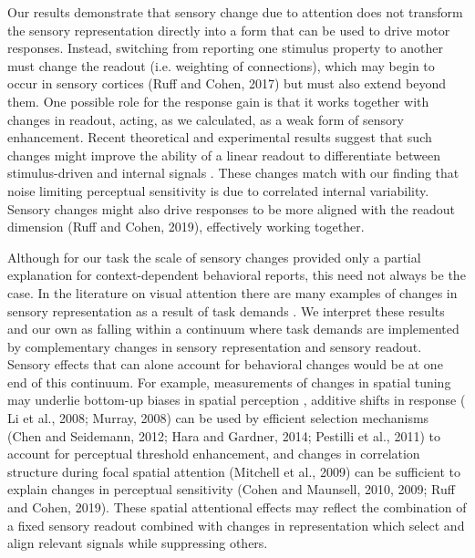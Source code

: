 \documentclass{report}
\begin{document}
Our results demonstrate that sensory change due to attention does not transform the sensory representation directly into a form that can be used to drive motor responses. Instead, switching from reporting one stimulus property to another must change the readout (i.e. weighting of connections), which may begin to occur in sensory cortices (Ruff and Cohen, 2017) but must also extend beyond them. One possible role for the response gain is that it works together with changes in readout, acting, as we calculated, as a weak form of sensory enhancement. Recent theoretical and experimental results suggest that such changes might improve the ability of a linear readout to differentiate between stimulus-driven and internal signals \citep{Ecker2016-ro,Rabinowitz2015-uz,Snyder2018-yr}. These changes match with our finding that noise limiting perceptual sensitivity is due to correlated internal variability. Sensory changes might also drive responses to be more aligned with the readout dimension (Ruff and Cohen, 2019), effectively working together.  

Although for our task the scale of sensory changes provided only a partial explanation for context-dependent behavioral reports, this need not always be the case. In the literature on visual attention there are many examples of changes in sensory representation as a result of task demands \citep{Carrasco2011-xp}. We interpret these results and our own as falling within a continuum where task demands are implemented by complementary changes in sensory representation and sensory readout. Sensory effects that can alone account for behavioral changes would be at one end of this continuum. For example, measurements of changes in spatial tuning \citep{Kay2015-pd,Klein2014-oe,Vo2017-oi} may underlie bottom-up biases in spatial perception \citep{Klein2016-ox}, additive shifts in response \citep{Buracas2007-pe}( Li et al., 2008; Murray, 2008) can be used by efficient selection mechanisms (Chen and Seidemann, 2012; Hara and Gardner, 2014; Pestilli et al., 2011) to account for perceptual threshold enhancement, and changes in correlation structure during focal spatial attention (Mitchell et al., 2009) can be sufficient to explain changes in perceptual sensitivity (Cohen and Maunsell, 2010, 2009; Ruff and Cohen, 2019). These spatial attentional effects may reflect the combination of a fixed sensory readout combined with changes in representation which select \citep{Carrasco2011-xp} and align \citep{Ruff2018-yx} relevant signals while suppressing others.
\end{document}
